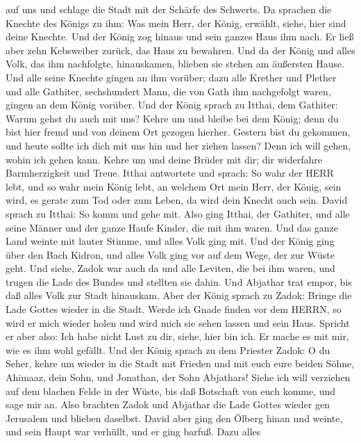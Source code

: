 auf uns und schlage die Stadt mit der Schärfe des Schwerts.
 Da sprachen die Knechte des Königs zu ihm: Was mein Herr,
der König, erwählt, siehe, hier sind deine Knechte.  Und
der König zog hinaus und sein ganzes Haus ihm nach. Er ließ aber zehn
Kebsweiber zurück, das Haus zu bewahren.  Und da der König
und alles Volk, das ihm nachfolgte, hinauskamen, blieben sie stehen am
äußersten Hause.  Und alle seine Knechte gingen an ihm
vorüber; dazu alle Krether und Plether und alle Gathiter, sechshundert
Mann, die von Gath ihm nachgefolgt waren, gingen an dem König vorüber.
 Und der König sprach zu Itthai, dem Gathiter: Warum gehst
du auch mit uns? Kehre um und bleibe bei dem König; denn du bist hier
fremd und von deinem Ort gezogen hierher.  Gestern bist du
gekommen, und heute sollte ich dich mit uns hin und her ziehen lassen?
Denn ich will gehen, wohin ich gehen kann. Kehre um und deine Brüder mit
dir; dir widerfahre Barmherzigkeit und Treue.  Itthai
antwortete und sprach: So wahr der HERR lebt, und so wahr mein König
lebt, an welchem Ort mein Herr, der König, sein wird, es gerate zum Tod
oder zum Leben, da wird dein Knecht auch sein.  David
sprach zu Itthai: So komm und gehe mit. Also ging Itthai, der Gathiter,
und alle seine Männer und der ganze Haufe Kinder, die mit ihm waren.
 Und das ganze Land weinte mit lauter Stimme, und alles
Volk ging mit. Und der König ging über den Bach Kidron, und alles Volk
ging vor auf dem Wege, der zur Wüste geht.  Und siehe,
Zadok war auch da und alle Leviten, die bei ihm waren, und trugen die
Lade des Bundes und stellten sie dahin. Und Abjathar trat empor, bis daß
alles Volk zur Stadt hinauskam.  Aber der König sprach zu
Zadok: Bringe die Lade Gottes wieder in die Stadt. Werde ich Gnade
finden vor dem HERRN, so wird er mich wieder holen und wird mich sie
sehen lassen und sein Haus.  Spricht er aber also: Ich habe
nicht Lust zu dir, siehe, hier bin ich. Er mache es mit mir, wie es ihm
wohl gefällt.  Und der König sprach zu dem Priester Zadok:
O du Seher, kehre um wieder in die Stadt mit Frieden und mit euch eure
beiden Söhne, Ahimaaz, dein Sohn, und Jonathan, der Sohn Abjathars!
 Siehe ich will verziehen auf dem blachen Felde in der
Wüste, bis daß Botschaft von euch komme, und sage mir an. 
Also brachten Zadok und Abjathar die Lade Gottes wieder gen Jerusalem
und blieben daselbst.  David aber ging den Ölberg hinan und
weinte, und sein Haupt war verhüllt, und er ging barfuß. Dazu alles
